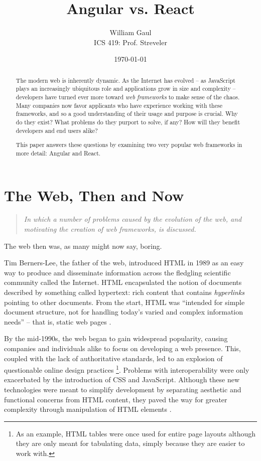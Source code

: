 \documentclass[12pt,letterpaper]{article}
\title{\textbf{Angular vs. React}}
\author{William Gaul\\{ICS 419: Prof. Streveler}}
\date{\today}
\begin{document}
\maketitle

\begin{singlespace*}
\begin{abstract}
	The modern web is inherently dynamic. As the Internet has evolved -- as JavaScript plays an increasingly ubiquitous role and applications grow in size and complexity -- developers have turned ever more toward \emph{web frameworks} to make sense of the chaos. Many companies now favor applicants who have experience working with these frameworks, and so a good understanding of their usage and purpose is crucial. Why do they exist? What problems do they purport to solve, if any? How will they benefit developers and end users alike?

	This paper answers these questions by examining two very popular web frameworks in more detail: Angular and React.
\end{abstract}
\end{singlespace*}


\section{The Web, Then and Now}
\vspace{-12pt}

\begin{quote}
	\singlespacing
	\emph{In which a number of problems caused by the evolution of the web, and motivating the creation of web frameworks, is discussed.}
\end{quote}

The web then was, as many might now say, boring.

Tim Berners-Lee, the father of the web, introduced HTML in 1989 as an easy way to produce and disseminate information across the fledgling scientific community called the Internet. HTML encapsulated the notion of documents described by something called hypertext: rich content that contains \emph{hyperlinks} pointing to other documents. From the start, HTML was ``intended for simple document structure, not for handling today's varied and complex information needs'' \cite[p.~9]{Sklar:2012} -- that is, static web pages \cite{Schlensker:2014}.

By the mid-1990s, the web began to gain widespread popularity, causing companies and individuals alike to focus on developing a web presence. This, coupled with the lack of authoritative standards, led to an explosion of questionable online design practices \footnote{As an example, HTML tables were once used for entire page layouts although they are only meant for tabulating data, simply because they are easier to work with.}. Problems with interoperability were only exacerbated by the introduction of CSS and JavaScript. Although these new technologies were meant to simplify development by separating aesthetic and functional concerns from HTML content, they paved the way for greater complexity through manipulation of HTML elements \cite{Sklar:2012}.
\end{document}
